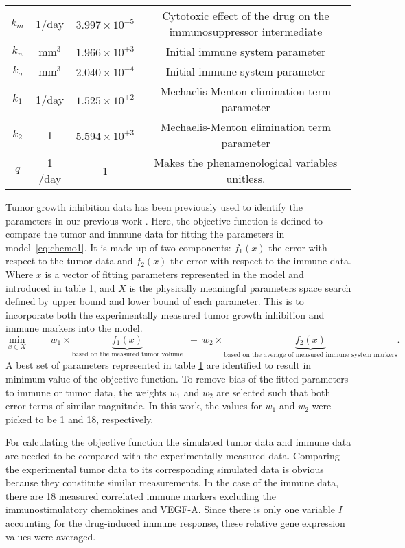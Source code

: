 \begin{landscape}
\begin{table}
\begin{tabular}{c c c c}
		$k_m$       & 1/day     & $3.997\times10^{-5}$  & Cytotoxic effect of the drug on the immunosuppressor intermediate\\
		$k_n$       & mm$^3$    & $1.966\times 10^{+3}$ & Initial immune system parameter \\ 
		$k_o$       & mm$^3$    & $2.040\times10^{-4}$  & Initial immune system parameter \\ 
		$k_1$       & 1/day     & $1.525\times 10^{+2}$ & Mechaelis-Menton elimination term parameter\\ 
		$k_2$       & 1         & $5.594\times 10^{+3}$ & Mechaelis-Menton elimination term parameter\\ 
		$q$       & 1 /day        & 1 & Makes the phenamenological variables unitless. \\ 
		\hline
	\end{tabular}
	\label{table:chemo1}
\end{table}
\end{landscape}
%
Tumor growth inhibition data has been previously used to identify the parameters in our previous work \cite{tran2020delicate}. Here, the objective function is defined to compare the tumor and immune data for fitting the parameters in model~\eqref{eq:chemo1}. It is made up of two components: $f_1(x)$ the error with respect to the tumor data and $f_2(x)$ the error with respect to the immune data. Where $x$ is a vector of fitting parameters represented in the model and introduced in table \ref{table:chemo1}, and $X$ is the physically meaningful parameters space search defined by upper bound and lower bound of each parameter. This is to incorporate both the experimentally measured tumor growth inhibition and immune markers into the model.
%
\begin{equation} \label{objective}
	\min_{x\in X}\; \qquad w_1\times\underbrace{f_1(x)}_\textrm{based on the measured tumor volume}\;\;+\; w_2\times\underbrace{f_2(x)}_\textrm{based on the average of measured immune system markers}.
\end{equation}
%
A best set of parameters represented in table \ref{table:chemo1} are identified to result in minimum value of the objective function. To remove bias of the fitted parameters to immune or tumor data, the weights $w_1$ and $w_2$ are selected such that both error terms of similar magnitude. In this work, the values for $w_1$ and $w_2$ were picked to be 1 and 18, respectively.

For calculating the objective function the simulated tumor data and immune data are needed to be compared with the experimentally measured data. Comparing the experimental tumor data to its corresponding simulated data is obvious because they constitute similar measurements. 
In the case of the immune data, there are 18 measured correlated immune markers excluding the immunostimulatory chemokines and VEGF-A. Since there is only one variable \textit{I} accounting for the drug-induced immune response, these relative gene expression values were averaged. 

